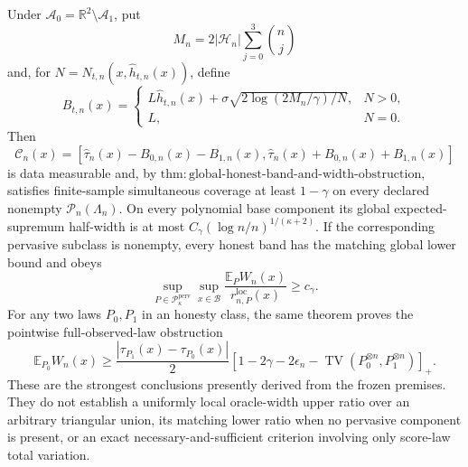 Under \(\mathcal A_0=\mathbb R^2\setminus\mathcal A_1\), put
\[
 M_n=2|\mathcal H_n|\sum_{j=0}^3\binom nj
\]
and, for \(N=N_{t,n}(x,\widehat h_{t,n}(x))\), define
\[
 B_{t,n}(x)=
 \begin{cases}
 L\widehat h_{t,n}(x)+
 \sigma\sqrt{2\log(2M_n/\gamma)/N},&N>0,\\
 L,&N=0.
 \end{cases}
\]
Then
\[
 \mathcal C_n(x)=
 \left[\widehat\tau_n(x)-B_{0,n}(x)-B_{1,n}(x),
       \widehat\tau_n(x)+B_{0,n}(x)+B_{1,n}(x)\right]
\]
is data measurable and, by
\(\mathrm{thm:global\text{-}honest\text{-}band\text{-}and\text{-}width\text{-}obstruction}\),
satisfies finite-sample simultaneous coverage at least \(1-\gamma\) on
every declared nonempty \(\mathcal P_n(\Lambda_n)\).  On every polynomial
base component its global expected-supremum half-width is at most
\(C_\gamma(\log n/n)^{1/(\kappa+2)}\).  If the corresponding pervasive
subclass is nonempty, every honest band has the matching global lower
bound and obeys
\[
 \sup_{P\in\mathcal P_\kappa^{\mathrm{perv}}}
 \sup_{x\in\mathcal B}
 \frac{\mathbb E_PW_n(x)}{r_{n,P}^{\mathrm{loc}}(x)}\ge c_\gamma.
\]
For any two laws \(P_0,P_1\) in an honesty class, the same theorem proves
the pointwise full-observed-law obstruction
\[
 \mathbb E_{P_0}W_n(x)\ge
 \frac{|\tau_{P_1}(x)-\tau_{P_0}(x)|}{2}
 \left[1-2\gamma-2\epsilon_n-
 \operatorname{TV}(P_0^{\otimes n},P_1^{\otimes n})\right]_+.
\]
These are the strongest conclusions presently derived from the frozen
premises.  They do not establish a uniformly local oracle-width upper
ratio over an arbitrary triangular union, its matching lower ratio when
no pervasive component is present, or an exact necessary-and-sufficient
criterion involving only score-law total variation.